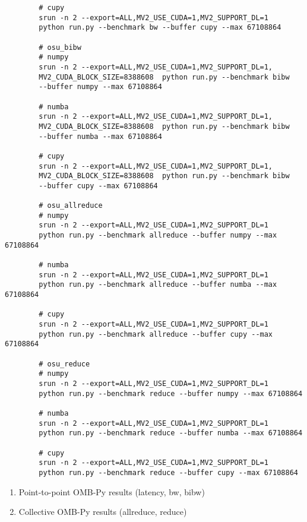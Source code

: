 \documentclass[12pt]{article}
\begin{document}
\begin{enumerate}
\begin{enumerate}
\begin{verbatim}
        # cupy
        srun -n 2 --export=ALL,MV2_USE_CUDA=1,MV2_SUPPORT_DL=1 
        python run.py --benchmark bw --buffer cupy --max 67108864
    
        # osu_bibw
        # numpy
        srun -n 2 --export=ALL,MV2_USE_CUDA=1,MV2_SUPPORT_DL=1,
        MV2_CUDA_BLOCK_SIZE=8388608  python run.py --benchmark bibw 
        --buffer numpy --max 67108864
    
        # numba
        srun -n 2 --export=ALL,MV2_USE_CUDA=1,MV2_SUPPORT_DL=1,
        MV2_CUDA_BLOCK_SIZE=8388608  python run.py --benchmark bibw 
        --buffer numba --max 67108864

        # cupy
        srun -n 2 --export=ALL,MV2_USE_CUDA=1,MV2_SUPPORT_DL=1,
        MV2_CUDA_BLOCK_SIZE=8388608  python run.py --benchmark bibw 
        --buffer cupy --max 67108864
    
        # osu_allreduce
        # numpy
        srun -n 2 --export=ALL,MV2_USE_CUDA=1,MV2_SUPPORT_DL=1 
        python run.py --benchmark allreduce --buffer numpy --max 67108864
    
        # numba
        srun -n 2 --export=ALL,MV2_USE_CUDA=1,MV2_SUPPORT_DL=1 
        python run.py --benchmark allreduce --buffer numba --max 67108864

        # cupy
        srun -n 2 --export=ALL,MV2_USE_CUDA=1,MV2_SUPPORT_DL=1 
        python run.py --benchmark allreduce --buffer cupy --max 67108864
    
        # osu_reduce
        # numpy
        srun -n 2 --export=ALL,MV2_USE_CUDA=1,MV2_SUPPORT_DL=1 
        python run.py --benchmark reduce --buffer numpy --max 67108864
    
        # numba
        srun -n 2 --export=ALL,MV2_USE_CUDA=1,MV2_SUPPORT_DL=1 
        python run.py --benchmark reduce --buffer numba --max 67108864

        # cupy
        srun -n 2 --export=ALL,MV2_USE_CUDA=1,MV2_SUPPORT_DL=1 
        python run.py --benchmark reduce --buffer cupy --max 67108864
        \end{verbatim}

    \begin{enumerate}
        \item Point-to-point OMB-Py results (latency, bw, bibw)
        \item Collective OMB-Py results (allreduce, reduce)
    \end{enumerate}


\end{enumerate}
\end{enumerate}
\end{document}
